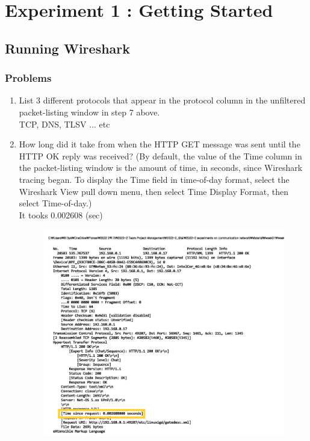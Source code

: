 \section{Experiment 1 : Getting Started}
\subsection{Running Wireshark}
    \subsubsection*{Problems}
    \begin{enumerate}[label=\bfseries Problem \arabic*:,leftmargin=*,labelindent=1em]
        \item List 3 different protocols that appear in the protocol column in the unfiltered packet-listing window in step 7 above.\\[0.2mm]
            \soln TCP, DNS, TLSV ... etc
        \item How long did it take from when the HTTP GET message was sent until the HTTP OK reply was received? 
        (By default, the value of the Time column in the packet-listing window is the amount of time, in seconds, 
        since Wireshark tracing began. To display the Time field in time-of-day format,
        select the Wireshark View pull down menu, then select Time Display Format, then select Time-of-day.) \\[0.2mm]
            \soln It tooks 0.002608 (sec)
            \vspace{-4mm}  
            \begin{figure}[!h]\centering
            \hspace{15mm} 
        		\includegraphics[width=.85\textwidth]{image/result_week01/Q1-2.jpg}

\end{figure}
\end{enumerate}

